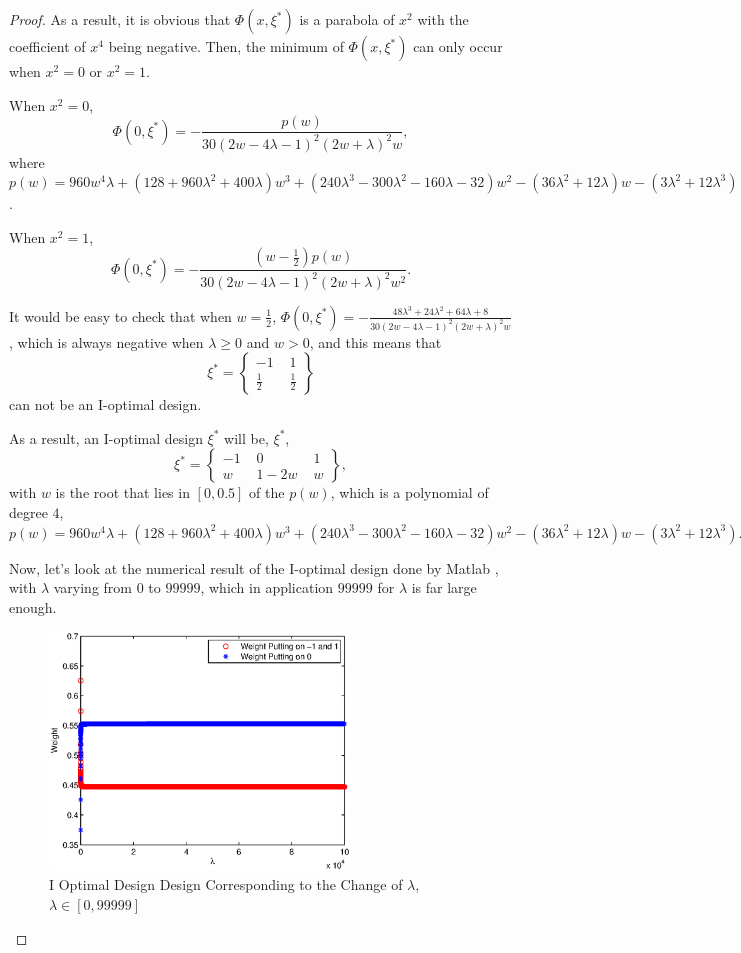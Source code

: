 \documentclass[preprint,12pt]{elsarticle}
\begin{document}
\begin{proof}
As a result, it is obvious that $\Phi(x,\xi^*)$ is a parabola of
$x^2$ with the coefficient of $x^4$ being negative. Then, the
minimum of $\Phi(x,\xi^*)$ can only occur when $x^2=0$ or $x^2=1$.

When $x^2=0$,
$$\Phi(0,\xi^*)=-\frac{p(w)}{30(2w-4\lambda-1)^2(2w+\lambda)^2w},$$
where
$p(w)=960w^4\lambda+\left(128+960\lambda^2+400\lambda\right)w^3+\left(240\lambda^3-300\lambda^2-160\lambda-32\right)w^2-\left(36\lambda^2+12\lambda\right)w-\left(3\lambda^2+12\lambda^3\right)$.

When $x^2=1$,
$$\Phi(0,\xi^*)=-\frac{\left(w-\frac{1}{2}\right)p(w)}{30(2w-4\lambda-1)^2(2w+\lambda)^2w^2}.$$

It would be easy to check that when $w=\frac{1}{2}$,
$\Phi(0,\xi^*)=-\frac{48\lambda^3+24\lambda^2+64\lambda+8}{30(2w-4\lambda-1)^2(2w+\lambda)^2w}$,
which is always negative when $\lambda\geq 0$ and $w>0$, and this
means that
$$\xi^*=\left\{\begin{array}{ccc}-1\,\,&1\\
\frac{1}{2}\,\,&\frac{1}{2}\end{array}\right\}$$ can not be an
I-optimal design.

As a result, an I-optimal design $\xi^*$ will be, $\xi^*$,
$$\xi^*=\left\{\begin{array}{ccc}-1\,\,&0\,\,&1\\w\,\,&1-2w\,\,&w\end{array}\right\},$$
with $w$ is the root that lies in $[0,0.5]$ of the $p(w)$, which is
a polynomial of degree $4$,
$p(w)=960w^4\lambda+\left(128+960\lambda^2+400\lambda\right)w^3+\left(240\lambda^3-300\lambda^2-160\lambda-32\right)w^2-\left(36\lambda^2+12\lambda\right)w-\left(3\lambda^2+12\lambda^3\right).$

Now, let's look at the numerical result of the I-optimal design done
by Matlab , with $\lambda$ varying from $0$ to $99999$, which in
application $99999$ for $\lambda$ is far large enough.
\begin{figure}[htpb]
\begin{center}
\includegraphics[width=8cm]{IoptL.eps}
\caption{\label{fig:IoptL} I Optimal Design Design Corresponding to
the Change of $\lambda$, $\lambda\in[0,99999]$ }
\end{center}
\end{figure}


\end{proof}
\end{document}
